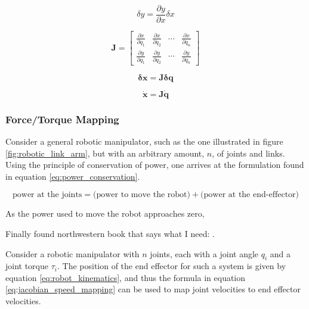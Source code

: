 \begin{equation}
    \label{eq:infinitesimal_change}
    \delta  y = \frac{\partial y}{\partial x} \delta x
\end{equation}

\begin{equation}
    \label{eq:jacobian}
    \mathbf{J} = \begin{bmatrix}
        \frac{\partial x}{\partial q_1} & \frac{\partial x}{\partial q_2} & \cdots & \frac{\partial x}{\partial q_n} \\
        \frac{\partial y}{\partial q_1} & \frac{\partial y}{\partial q_2} & \cdots & \frac{\partial y}{\partial q_n}
    \end{bmatrix}
\end{equation}

\begin{equation}
    \label{eq:jacobian_pos_mapping}
    \mathbf{\delta x} = \mathbf{J}\mathbf{\delta q}
\end{equation}

\begin{equation}
    \label{eq:jacobian_speed_mapping}
    \mathbf{\dot x} = \mathbf{J}\mathbf{\dot q}
\end{equation}

    \subsubsection{Force/Torque Mapping}

    Consider a general robotic manipulator, such as the one illustrated in figure \ref{fig:robotic_link_arm}, but with an arbitrary amount, $n$, of joints and links. Using the principle of conservation of power, one arrives at the formulation found in equation \ref{eq:power_conservation}.

    \begin{equation}
        \text{power at the joints} = \text{(power to move the robot)} + \text{(power at the end-effector)}
        \label{eq:power_conservation}
    \end{equation}
    
    As the power used to move the robot approaches zero, 

    Finally found northwestern book that says what I need: \cite{modern_robotics_book}. 

    Consider a robotic manipulator with $n$ joints, each with a joint angle $q_i$ and a joint torque $\tau_i$. The position of the end effector for such a system is given by equation \ref{eq:robot_kinematics}, and thus the formula in equation \ref{eq:jacobian_speed_mapping} can be used to map joint velocities to end effector velocities. 


